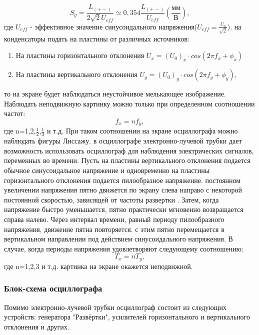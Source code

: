 \begin{equation}
\label{eq:2}
    S_{y}=\frac{L_{(+-)}}{2\sqrt{2}U_{eff} } \simeq 0,354\frac{L_{(+-)}}{U_{eff} }(\frac{\text{мм}}{\text{В}}),
\end{equation}
где $U_{eff}$ - эффективное значение синусоидального напряжения($U_{eff}=\frac{U_0}{\sqrt{2}}$).
 на конденсаторы подать на пластины от различных источников:
\begin{enumerate}
    \item На пластины горизонтального отклонения  $U_x=(U_0)_x\cdot cos(2\pi{}f_x+\phi_x)$
   \item На пластины вертикального отклонения $U_y=(U_0)_y\cdot cos(2\pi{}f_y+\phi_y)$,
\end{enumerate}
то на экране будет наблюдаться неустойчивое мелькающее изображение. Наблюдать неподвижную картинку можно только при определенном соотношении частот:
\begin{equation}
    f_{x}=nf_{y},
\end{equation}
 где n=1,2,$ \frac{1}{2}$,$ \frac{1}{3}$ и т.д. При таком соотношении на экране осциллографа можно наблюдать фигуры Лиссажу.
  в осциллографе электронно-лучевой трубки дает возможность
использовать осциллограф для наблюдения электрических сигналов, переменных во
времени. Пусть на пластины вертикального отклонения подается обычное синусоидальное напряжение и одновременно на пластины горизонтального отклонения подается пилообразное напряжение.
 постоянном увеличении напряжения пятно движется по экрану слева направо с некоторой постоянной скоростью, зависящей от частоты развертки . Затем, когда напряжение быстро уменьшается, пятно практически мгновенно возвращается справа налево. Через интервал времени, равный периоду пилообразного напряжения, движение пятна повторяется.
 с этим пятно перемещается в вертикальном направлении под действием синусоидального напряжения. В случае, когда периоды напряжения удовлетворяют следующему соотношению: 
\begin{equation}
    T_{x}=nT_{y},
\end{equation}
где n=1,2,3 и т.д. картинка на экране окажется неподвижной.

\subsubsection{Блок-схема осциллографа}
Помимо электронно-лучевой трубки осциллограф состоит из следующих устройств: генератора "Развёртки", усилителей горизонтального и вертикального отклонения и других.




